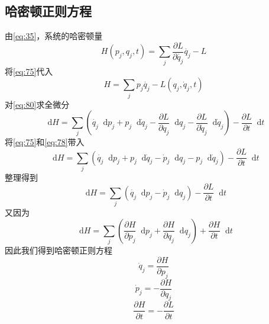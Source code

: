 \documentclass{article}
\newcommand*{\dif}{\mathop{}\!\mathrm{d}}
\begin{document}
\subsection{哈密顿正则方程}

由\ref{eq:35}，系统的哈密顿量
\begin{equation}
  \label{eq:79}
  H \left( p_{j},q_{j},t \right) = \sum\limits_{j} \frac{\partial L}{\partial \dot{q_{j}}} \dot{q_{j}} -L
\end{equation}
将\ref{eq:75}代入
\begin{equation}
  \label{eq:80}
  H = \sum\limits_{j} p_{j} \dot{q_{j}} -L \left( q_{j},\dot{q}_{j},t \right)
\end{equation}
对\ref{eq:80}求全微分
\begin{equation}
  \label{eq:81}
  \dif H  = \sum\limits_{j} \left(  \dot{q_{j}} \dif p_{j} + p_{j} \dif \dot{q}_{j} - \dfrac{\partial L}{\partial q_{j}} \dif q_{j} - \dfrac{\partial L}{\partial \dot{q}_{j}} \dif \dot{q}_j \right) - \dfrac{\partial L}{\partial t} \dif t
\end{equation}
将\ref{eq:75}和\ref{eq:78}带入
\begin{equation}
  \label{eq:82}
  \dif H = \sum\limits_{j} \left(  \dot{q_{j}} \dif p_{j} + p_{j} \dif \dot{q}_{j} - \dot{p}_{j} \dif q_{j} - p_{j} \dif \dot{q}_j \right) - \dfrac{\partial L}{\partial t} \dif t
\end{equation}
整理得到
\begin{equation}
  \label{eq:83}
  \dif H = \sum\limits_{j} \left(  \dot{q_{j}} \dif p_{j} - \dot{p}_{j} \dif q_{j} \right) - \dfrac{\partial L}{\partial t} \dif t
\end{equation}
又因为
\begin{equation}
  \label{eq:84}
  \dif H = \sum\limits_{j}\left( \dfrac{\partial H}{\partial p_{j}} \dif p_{j} + \dfrac{\partial H}{\partial q_{j}} \dif q_{j} \right) + \dfrac{\partial H}{\partial t} \dif t
\end{equation}
因此我们得到哈密顿正则方程
\begin{equation}
  \label{eq:85}
  \dot{q}_{j} = \dfrac{\partial H}{\partial p_{j}}
\end{equation}
\begin{equation}
  \label{eq:86}
  \dot{p}_{j} = -\dfrac{\partial H}{\partial q_{j}}
\end{equation}
\begin{equation}
  \label{eq:87}
  \dfrac{\partial H}{\partial t} = - \dfrac{\partial L}{\partial t}
\end{equation}
\end{document}
